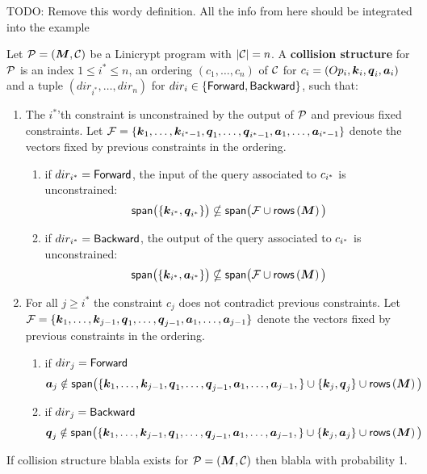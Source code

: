 TODO: Remove this wordy definition.
All the info from here should be integrated into the example

\begin{defn}
Let $\P = (\M, \C)$ be a Linicrypt program with $|\C| = n$.
A \textbf{collision structure} for $\P$ is an index $1 \leq i^* \leq n$, an ordering $(c_1, \dots, c_n)$ of $\C$ for $c_i = (Op_i, \v k_i, \v q_i,\v a_i)$
and a tuple $(dir_{i^*}, \dots, dir_n)$ for $dir_i \in \{\For, \Back\}$,
such that:
\begin{enumerate}
\item The $i^*$'th constraint is unconstrained by the output of $\P$ and previous fixed constraints.
Let $\mathcal{F} = \{
    \v k_1, \dots, \v k_{i^* -1},
    \v q_1, \dots, \v q_{i^* -1},
    \v a_1, \dots, \v a_{i^* -1}
    \}$
denote the vectors fixed by previous constraints in the ordering.
\begin{enumerate}
    \item if $dir_\is = \For$, the input of the query associated to $c_\is$ is unconstrained:
        \[
            \spn\big(\{ \v k_{i^*}, \v q_{i^*} \}\big) \nsubseteq
            \spn\big( \mathcal{F} \cup \rows\left(\M\right) \big)
        \]
    \item if $dir_\is = \Back$, the output of the query associated to $c_\is$ is unconstrained:
        \[
            \spn\big(\{ \v k_{i^*}, \v a_{i^*} \}\big) \nsubseteq
            \spn\big( \mathcal{F} \cup \rows\left(\M\right) \big)
        \]
\end{enumerate}
\item For all $j \geq i^*$ the constraint $c_j$ does not contradict previous constraints.
Let $\mathcal{F} = \{
    \v k_1, \dots, \v k_{j -1},
    \v q_1, \dots, \v q_{j -1},
    \v a_1, \dots, \v a_{j -1}
    \}$
denote the vectors fixed by previous constraints in the ordering.
\begin{enumerate}
    \item if $dir_j = \For$
        \[
        \v a_j \notin \spn\big( \{
        \v k_1, \dots, \v k_{j -1},
        \v q_1, \dots, \v q_{j -1},
        \v a_1, \dots, \v a_{j -1},
        \} 
        \cup \{ \v k_j, \v q_j\}
        \cup \rows\left(\M\right)
        \big)
        \]
    \item if $dir_j = \Back$
        \[
        \v q_j \notin \spn\big( \{
        \v k_1, \dots, \v k_{j -1},
        \v q_1, \dots, \v q_{j -1},
        \v a_1, \dots, \v a_{j -1},
        \} 
        \cup \{ \v k_j, \v a_j\}
        \cup \rows\left(\M\right)
        \big)
        \]
\end{enumerate}
\end{enumerate}
\end{defn}

\begin{lemma}
    If collision structure blabla exists for $\P = (\M, \C)$ then blabla with probability 1.
\end{lemma}

